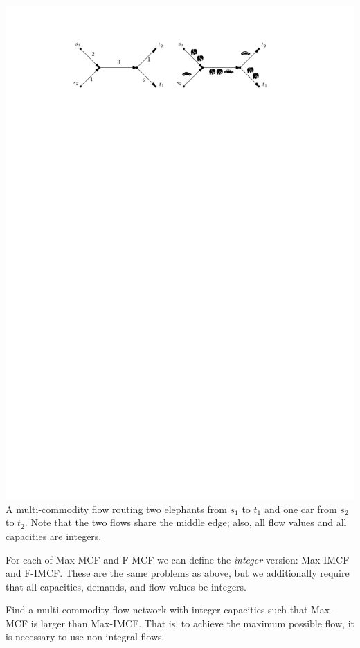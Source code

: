 \documentclass[12pt,a4]{article}
\begin{document}
\begin{center}
\includegraphics[width=\textwidth]{figures/multi-commodity-flow.pdf}\\
\small A multi-commodity flow routing two elephants from $s_1$ to $t_1$ and one car from $s_2$ to $t_2$.
Note that the two flows share the middle edge; also, all flow values and all capacities are integers.
\end{center}

For each of Max-MCF and F-MCF we can define the {\em integer} version: Max-IMCF and F-IMCF.
These are the same problems as above, but we additionally require that all capacities, demands, and
flow values be integers.

\begin{exercise}
    Find a multi-commodity flow network with integer capacities such that Max-MCF is larger than
    Max-IMCF. That is, to achieve the maximum possible flow, it is necessary to use non-integral flows.
\end{exercise}
\end{document}
